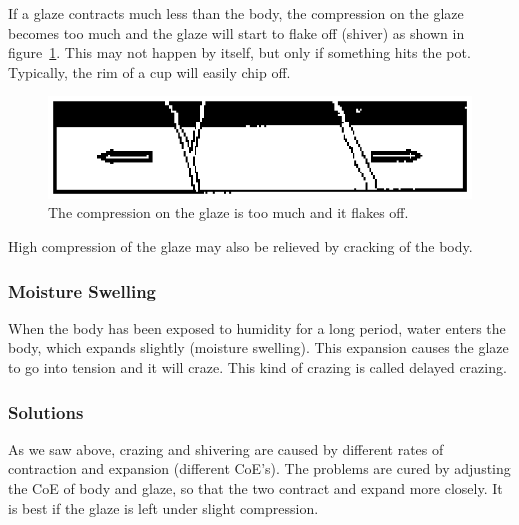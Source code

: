 If a glaze contracts much less than the body, the compression on the glaze 
becomes too much and the glaze will start to flake off (shiver) as shown in 
figure~\ref{fig:coeshiver}. This may not happen by itself, but only if 
something hits the pot. Typically, the rim of a cup will easily chip off.
\begin{figure}[htbp!]
  \centering
  \includegraphics[width=0.6\linewidth]{img/coeshiver.eps}
  \caption{The compression on the glaze is too much and it flakes off.}
  \label{fig:coeshiver}
\end{figure}
High compression of the glaze may also be relieved by cracking of the body.
\subsubsection{Moisture Swelling}
When the body has been exposed to humidity for a long period, water enters the 
body, which expands slightly (moisture swelling). This expansion causes the 
glaze to go into tension and it will craze. This kind of crazing is called 
delayed crazing.
\subsubsection{Solutions}
As we saw above, crazing and shivering are caused by different rates of 
contraction and expansion (different CoE's). The problems are cured by 
adjusting the CoE of body and glaze, so that the two contract and expand more 
closely. It is best if the glaze is left under slight compression.
